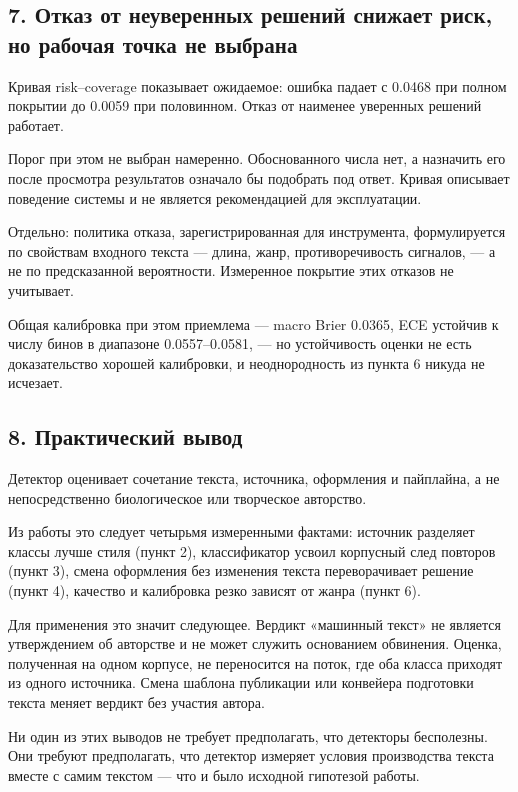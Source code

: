 \documentclass[11pt,a4paper]{article}
\renewcommand{\_}{\textunderscore\allowbreak}
\begin{document}
\subsection{7. Отказ от неуверенных решений снижает риск, но рабочая точка не выбрана}

Кривая risk–coverage показывает ожидаемое: ошибка падает с 0.0468 при полном
покрытии до 0.0059 при половинном. Отказ от наименее уверенных решений работает.

Порог при этом не выбран намеренно. Обоснованного числа нет, а назначить его после
просмотра результатов означало бы подобрать под ответ. Кривая описывает поведение
системы и не является рекомендацией для эксплуатации.

Отдельно: политика отказа, зарегистрированная для инструмента, формулируется по
свойствам входного текста — длина, жанр, противоречивость сигналов, — а не по
предсказанной вероятности. Измеренное покрытие этих отказов не учитывает.

Общая калибровка при этом приемлема — macro Brier 0.0365, ECE устойчив к числу
бинов в диапазоне 0.0557–0.0581, — но устойчивость оценки не есть доказательство
хорошей калибровки, и неоднородность из пункта 6 никуда не исчезает.

\subsection{8. Практический вывод}

Детектор оценивает сочетание текста, источника, оформления и пайплайна, а не
непосредственно биологическое или творческое авторство.

Из работы это следует четырьмя измеренными фактами: источник разделяет классы
лучше стиля (пункт 2), классификатор усвоил корпусный след повторов (пункт 3),
смена оформления без изменения текста переворачивает решение (пункт 4), качество
и калибровка резко зависят от жанра (пункт 6).

Для применения это значит следующее. Вердикт «машинный текст» не является
утверждением об авторстве и не может служить основанием обвинения. Оценка,
полученная на одном корпусе, не переносится на поток, где оба класса приходят из
одного источника. Смена шаблона публикации или конвейера подготовки текста меняет
вердикт без участия автора.

Ни один из этих выводов не требует предполагать, что детекторы бесполезны. Они
требуют предполагать, что детектор измеряет условия производства текста вместе с
самим текстом — что и было исходной гипотезой работы.
\end{document}
